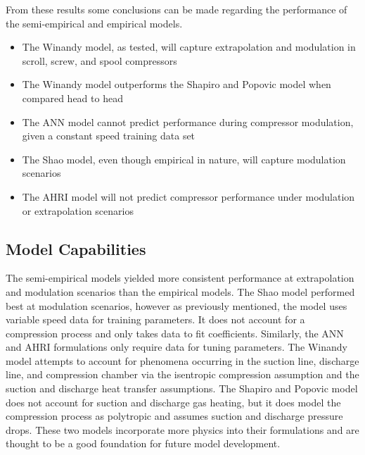 \documentclass[preprint,11pt,authoryear]{elsarticle}
\begin{document}
From these results some conclusions can be made regarding the performance of the semi-empirical and empirical models.
\begin{itemize}
\item The Winandy model, as tested, will capture extrapolation and modulation in scroll, screw, and spool compressors
\end{itemize}
\begin{itemize}
\item The Winandy model outperforms the Shapiro and Popovic model when compared head to head
\end{itemize}
\begin{itemize}
\item The ANN model cannot predict performance during compressor modulation, given a constant speed training data set
\end{itemize}
\begin{itemize}
\item The Shao model, even though empirical in nature, will capture modulation scenarios
\end{itemize}
\begin{itemize}
\item The AHRI model will not predict compressor performance under modulation or extrapolation scenarios
\end{itemize}


\subsection{Model Capabilities}

The semi-empirical models yielded more consistent performance at extrapolation and modulation scenarios than the empirical models. The Shao model performed best at modulation scenarios, however as previously mentioned, the model uses variable speed data for training parameters. It does not account for a compression process and only takes data to fit coefficients. Similarly, the ANN and AHRI formulations only require data for tuning parameters. The Winandy model attempts to account for phenomena occurring in the suction line, discharge line, and compression chamber via the isentropic compression assumption and the suction and discharge heat transfer assumptions. The Shapiro and Popovic model does not account for suction and discharge gas heating, but it does model the compression process as polytropic and assumes suction and discharge pressure drops. These two models incorporate more physics into their formulations and are thought to be a good foundation for future model development. 
\end{document}
